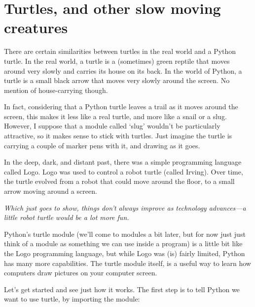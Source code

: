 

\chapter{Turtles, and other slow moving creatures}\label{ch:turtles}

There are certain similarities between turtles in the real world and a Python turtle.  In the real world, a turtle is a (sometimes) green reptile that moves around very slowly and carries its house on its back.  In the world of Python, a turtle is a small black arrow that moves very slowly around the screen. No mention of house-carrying though.

In fact, considering that a Python turtle leaves a trail as it moves around the screen, this makes it less like a real turtle, and more like a snail or a slug.  However, I suppose that a module called `slug' wouldn't be particularly attractive, so it makes sense to stick with turtles.  Just imagine the turtle is carrying a couple of marker pens with it, and drawing as it goes.

In the deep, dark, and distant past, there was a simple programming language called Logo.  Logo was used to control a robot turtle (called Irving).  Over time, the turtle evolved from a robot that could move around the floor, to a small arrow moving around a screen.

\emph{Which just goes to show, things don't always improve as technology advances---a little robot turtle would be a lot more fun.}

Python's turtle module (we'll come to modules a bit later, but for now just just think of a module as something we can use inside a program) is a little bit like the Logo programming language, but while Logo was (is) fairly limited, Python has many more capabilities.  The turtle module itself, is a useful way to learn how computers draw pictures on your computer screen.

Let's get started and see just how it works.  The first step is to tell Python we want to use turtle, by importing the module:

